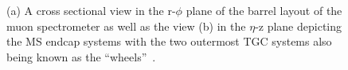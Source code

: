 \begin{figure}[h]
  \caption[The muon spectrometer system.]
          {(a) A cross sectional view in the r-$\phi$ plane of the barrel layout of the muon spectrometer as well as the view (b) in the $\eta$-z plane depicting the MS endcap systems with the two outermost TGC systems also being known as the ``wheels''~\cite{ATLAS:2010xrj}.}
      \label{fig:detector:muonspectrometer}
\end{figure}
